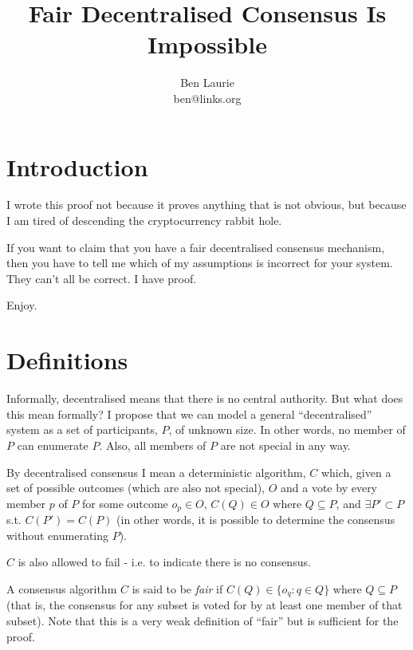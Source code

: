 \documentclass[a4paper]{article}
\title{Fair Decentralised Consensus Is Impossible}
\author{Ben Laurie \\
ben@links.org}
\begin{document}
\maketitle

\def\mod#1{\,(\textrm{mod}\,#1)}
\def\implies{\Rightarrow}
\def\qe#1{\begin{equation}#1\end{equation}}
\def\qearray#1{\begin{eqnarray}#1\end{eqnarray}}
\def\oneway#1{\textrm{oneway}(#1)}
\def\preoneway#1{\textrm{preoneway}(#1)}

\setlength{\parindent}{0pt}
\setlength{\parskip}{1ex plus 0.5ex minus 0.2ex}

\section{Introduction}

I wrote this proof not because it proves anything that is not obvious,
but because I am tired of descending the cryptocurrency rabbit hole.

If you want to claim that you have a fair decentralised consensus
mechanism, then you have to tell me which of my assumptions is
incorrect for your system. They can't all be correct. I have proof.

Enjoy.

\section{Definitions}

Informally, decentralised means that there is no central
authority. But what does this mean formally? I propose that we can
model a general ``decentralised'' system as a set of participants,
$P$, of unknown size. In other words, no member of $P$ can enumerate
$P$. Also, all members of $P$ are not special in any way.

By decentralised consensus I mean a deterministic algorithm, $C$
which, given a set of possible outcomes (which are also not special),
$O$ and a vote by every member $p$ of $P$ for some outcome $o_p \in
O$, $C(Q) \in O$ where $Q \subseteq P$, and $\exists P' \subset P$
s.t. $C(P') = C(P)$ (in other words, it is possible to determine the
consensus without enumerating $P$).

$C$ is also allowed to fail - i.e. to indicate there is no consensus.

A consensus algorithm $C$ is said to be {\it fair} if  $C(Q)
\in \{o_q : q \in Q\}$ where $Q \subseteq P$ (that is, the consensus
for any subset is voted for by at least one member of that
subset). Note that this is a very weak definition of ``fair'' but is
sufficient for the proof.
\end{document}

